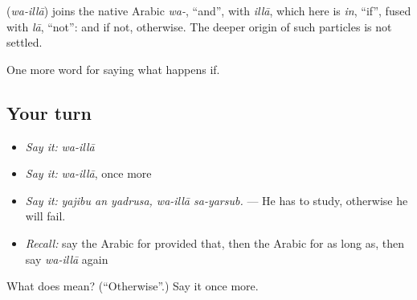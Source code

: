 \begin{cousinweb}
\textbf{} (\emph{wa-illā}) joins the native Arabic \emph{wa-}, \textquotedblleft{}and\textquotedblright{}, with \emph{illā}, which here is \emph{in}, \textquotedblleft{}if\textquotedblright{}, fused with \emph{lā}, \textquotedblleft{}not\textquotedblright{}: and if not, otherwise. The deeper origin of such particles is not settled.
\end{cousinweb}

\begin{grammarlens}[title={What you've built}]
One more word for saying what happens if.
\end{grammarlens}

\subsection*{Your turn}
\begin{itemize}
\raggedright
  \item \emph{Say it:} \emph{wa-illā}
  \item \emph{Say it:} \emph{wa-illā}, once more
  \item \emph{Say it:} \emph{yajibu an yadrusa, wa-illā sa-yarsub.} — He has to study, otherwise he will fail.
  \item \emph{Recall:} say the Arabic for provided that, then the Arabic for as long as, then say \emph{wa-illā} again
\end{itemize}

\begin{tcolorbox}[breakable,colback=teal!4,colframe=teal!35!black,title={Before you move on}]
What does  mean? (\textquotedblleft{}Otherwise\textquotedblright{}.) Say it once more.
\end{tcolorbox}
